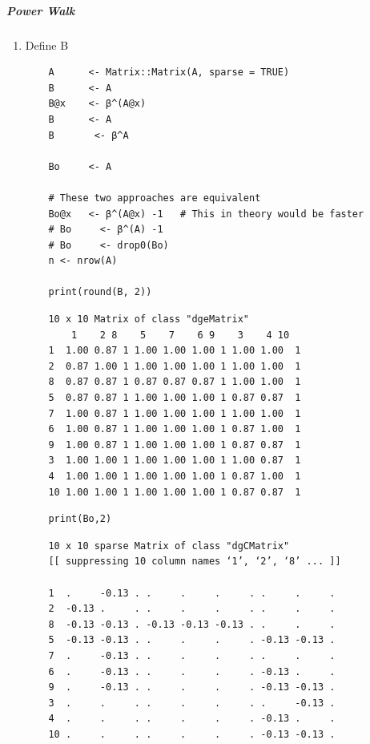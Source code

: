 \documentclass[11pt]{report}
\begin{document}
\subparagraph{Power Walk}
\label{sec:org4e03252}
\begin{enumerate}
\item Define B
\label{sec:orgde2e7a6}

\begin{tcolorbox}
    \begin{verbatim}
    A      <- Matrix::Matrix(A, sparse = TRUE)
    B      <- A
    B@x    <- β^(A@x)
    B      <- A
    B       <- β^A

    Bo     <- A

    # These two approaches are equivalent
    Bo@x   <- β^(A@x) -1   # This in theory would be faster
    # Bo     <- β^(A) -1
    # Bo     <- drop0(Bo)
    n <- nrow(A)

    print(round(B, 2))
    \end{verbatim}
\tcblower
    \begin{verbatim}
    10 x 10 Matrix of class "dgeMatrix"
        1    2 8    5    7    6 9    3    4 10
    1  1.00 0.87 1 1.00 1.00 1.00 1 1.00 1.00  1
    2  0.87 1.00 1 1.00 1.00 1.00 1 1.00 1.00  1
    8  0.87 0.87 1 0.87 0.87 0.87 1 1.00 1.00  1
    5  0.87 0.87 1 1.00 1.00 1.00 1 0.87 0.87  1
    7  1.00 0.87 1 1.00 1.00 1.00 1 1.00 1.00  1
    6  1.00 0.87 1 1.00 1.00 1.00 1 0.87 1.00  1
    9  1.00 0.87 1 1.00 1.00 1.00 1 0.87 0.87  1
    3  1.00 1.00 1 1.00 1.00 1.00 1 1.00 0.87  1
    4  1.00 1.00 1 1.00 1.00 1.00 1 0.87 1.00  1
    10 1.00 1.00 1 1.00 1.00 1.00 1 0.87 0.87  1
    \end{verbatim}
\end{tcolorbox}

\begin{tcolorbox}
    \begin{verbatim}
    print(Bo,2)
    \end{verbatim}

    \begin{verbatim}
    10 x 10 sparse Matrix of class "dgCMatrix"
    [[ suppressing 10 column names ‘1’, ‘2’, ‘8’ ... ]]

    1  .     -0.13 . .     .     .     . .     .     .
    2  -0.13 .     . .     .     .     . .     .     .
    8  -0.13 -0.13 . -0.13 -0.13 -0.13 . .     .     .
    5  -0.13 -0.13 . .     .     .     . -0.13 -0.13 .
    7  .     -0.13 . .     .     .     . .     .     .
    6  .     -0.13 . .     .     .     . -0.13 .     .
    9  .     -0.13 . .     .     .     . -0.13 -0.13 .
    3  .     .     . .     .     .     . .     -0.13 .
    4  .     .     . .     .     .     . -0.13 .     .
    10 .     .     . .     .     .     . -0.13 -0.13 .
    \end{verbatim}
\end{tcolorbox}


\end{enumerate}
\end{document}
